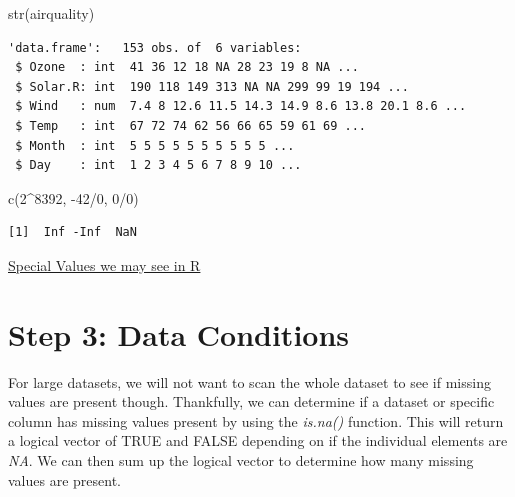 \documentclass[
  letterpaper,
  DIV=11,
  numbers=noendperiod]{scrreprt}
\newenvironment{Shaded}{\begin{snugshade}}{\end{snugshade}}
\newcommand{\DecValTok}[1]{\textcolor[rgb]{0.68,0.00,0.00}{#1}}
\newcommand{\FunctionTok}[1]{\textcolor[rgb]{0.28,0.35,0.67}{#1}}
\newcommand{\NormalTok}[1]{\textcolor[rgb]{0.00,0.23,0.31}{#1}}
\newcommand{\SpecialCharTok}[1]{\textcolor[rgb]{0.37,0.37,0.37}{#1}}
\begin{document}
\begin{Shaded}
\begin{Highlighting}[]
\FunctionTok{str}\NormalTok{(airquality)}
\end{Highlighting}
\end{Shaded}

\begin{verbatim}
'data.frame':   153 obs. of  6 variables:
 $ Ozone  : int  41 36 12 18 NA 28 23 19 8 NA ...
 $ Solar.R: int  190 118 149 313 NA NA 299 99 19 194 ...
 $ Wind   : num  7.4 8 12.6 11.5 14.3 14.9 8.6 13.8 20.1 8.6 ...
 $ Temp   : int  67 72 74 62 56 66 65 59 61 69 ...
 $ Month  : int  5 5 5 5 5 5 5 5 5 5 ...
 $ Day    : int  1 2 3 4 5 6 7 8 9 10 ...
\end{verbatim}

\begin{Shaded}
\begin{Highlighting}[]
\FunctionTok{c}\NormalTok{(}\DecValTok{2}\SpecialCharTok{\^{}}\DecValTok{8392}\NormalTok{, }\SpecialCharTok{{-}}\DecValTok{42}\SpecialCharTok{/}\DecValTok{0}\NormalTok{, }\DecValTok{0}\SpecialCharTok{/}\DecValTok{0}\NormalTok{)}
\end{Highlighting}
\end{Shaded}

\begin{verbatim}
[1]  Inf -Inf  NaN
\end{verbatim}

\begin{watch}{}{}
    \href{https://youtu.be/nkYpKiHXc0o}{Special Values we may see in R}
\end{watch}

\section{Step 3: Data Conditions}\label{step-3-data-conditions}

For large datasets, we will not want to scan the whole dataset to see if
missing values are present though. Thankfully, we can determine if a
dataset or specific column has missing values present by using the
\emph{is.na()} function. This will return a logical vector of TRUE and
FALSE depending on if the individual elements are \emph{NA}. We can then
sum up the logical vector to determine how many missing values are
present.

\begin{Shaded}
\end{Shaded}
\end{document}
